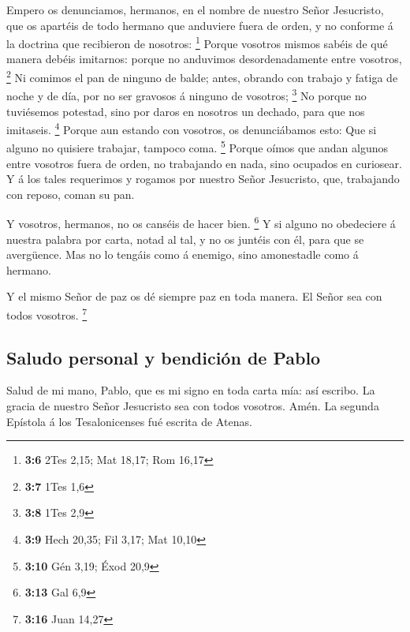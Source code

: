  Empero os denunciamos, hermanos, en el nombre de nuestro
Señor Jesucristo, que os apartéis de todo hermano que anduviere fuera de
orden, y no conforme á la doctrina que recibieron de nosotros:
\footnote{\textbf{3:6} 2Tes 2,15; Mat 18,17; Rom 16,17} 
Porque vosotros mismos sabéis de qué manera debéis imitarnos: porque no
anduvimos desordenadamente entre vosotros, \footnote{\textbf{3:7} 1Tes
  1,6}  Ni comimos el pan de ninguno de balde; antes,
obrando con trabajo y fatiga de noche y de día, por no ser gravosos á
ninguno de vosotros; \footnote{\textbf{3:8} 1Tes 2,9}  No
porque no tuviésemos potestad, sino por daros en nosotros un dechado,
para que nos imitaseis. \footnote{\textbf{3:9} Hech 20,35; Fil 3,17; Mat
  10,10}  Porque aun estando con vosotros, os
denunciábamos esto: Que si alguno no quisiere trabajar, tampoco coma.
\footnote{\textbf{3:10} Gén 3,19; Éxod 20,9}  Porque
oímos que andan algunos entre vosotros fuera de orden, no trabajando en
nada, sino ocupados en curiosear.  Y á los tales
requerimos y rogamos por nuestro Señor Jesucristo, que, trabajando con
reposo, coman su pan.

 Y vosotros, hermanos, no os canséis de hacer bien.
\footnote{\textbf{3:13} Gal 6,9}  Y si alguno no
obedeciere á nuestra palabra por carta, notad al tal, y no os juntéis
con él, para que se avergüence.  Mas no lo tengáis como á
enemigo, sino amonestadle como á hermano.

 Y el mismo Señor de paz os dé siempre paz en toda
manera. El Señor sea con todos vosotros. \footnote{\textbf{3:16} Juan
  14,27}

\hypertarget{saludo-personal-y-bendiciuxf3n-de-pablo}{%
\subsection{Saludo personal y bendición de
Pablo}\label{saludo-personal-y-bendiciuxf3n-de-pablo}}

 Salud de mi mano, Pablo, que es mi signo en toda carta
mía: así escribo.  La gracia de nuestro Señor Jesucristo
sea con todos vosotros. Amén. La segunda Epístola á los Tesalonicenses
fué escrita de Atenas.
